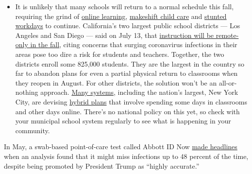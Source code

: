 \begin{itemize}
  \begin{itemize}
  \tightlist
  \item
    It is unlikely that many schools will return to a normal schedule
    this fall, requiring the grind of
    \href{https://www.nytimes3xbfgragh.onion/2020/06/05/us/coronavirus-education-lost-learning.html?action=click\&pgtype=Article\&state=default\&region=MAIN_CONTENT_3\&context=storylines_faq}{online
    learning},
    \href{https://www.nytimes3xbfgragh.onion/2020/05/29/us/coronavirus-child-care-centers.html?action=click\&pgtype=Article\&state=default\&region=MAIN_CONTENT_3\&context=storylines_faq}{makeshift
    child care} and
    \href{https://www.nytimes3xbfgragh.onion/2020/06/03/business/economy/coronavirus-working-women.html?action=click\&pgtype=Article\&state=default\&region=MAIN_CONTENT_3\&context=storylines_faq}{stunted
    workdays} to continue. California's two largest public school
    districts --- Los Angeles and San Diego --- said on July 13, that
    \href{https://www.nytimes3xbfgragh.onion/2020/07/13/us/lausd-san-diego-school-reopening.html?action=click\&pgtype=Article\&state=default\&region=MAIN_CONTENT_3\&context=storylines_faq}{instruction
    will be remote-only in the fall}, citing concerns that surging
    coronavirus infections in their areas pose too dire a risk for
    students and teachers. Together, the two districts enroll some
    825,000 students. They are the largest in the country so far to
    abandon plans for even a partial physical return to classrooms when
    they reopen in August. For other districts, the solution won't be an
    all-or-nothing approach.
    \href{https://bioethics.jhu.edu/research-and-outreach/projects/eschool-initiative/school-policy-tracker/}{Many
    systems}, including the nation's largest, New York City, are
    devising
    \href{https://www.nytimes3xbfgragh.onion/2020/06/26/us/coronavirus-schools-reopen-fall.html?action=click\&pgtype=Article\&state=default\&region=MAIN_CONTENT_3\&context=storylines_faq}{hybrid
    plans} that involve spending some days in classrooms and other days
    online. There's no national policy on this yet, so check with your
    municipal school system regularly to see what is happening in your
    community.
  \end{itemize}
\end{itemize}

In May, a swab-based point-of-care test called Abbott ID Now
\href{https://www.nytimes3xbfgragh.onion/interactive/2020/05/12/us/coronavirus-testing-white-house.html}{made
headlines} when an analysis found that it might miss infections up to 48
percent of the time, despite being promoted by President Trump as
``highly accurate.''

